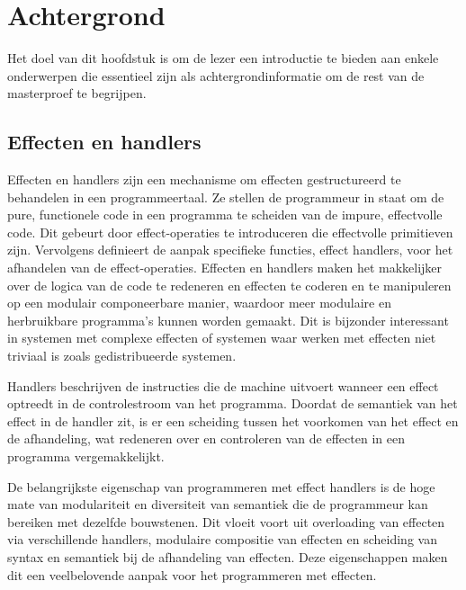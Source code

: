 \newtheorem{theorem}{Theorem}[section]
\newtheorem{lemma}[theorem]{Lemma}


\chapter{Achtergrond}
\label{hoofdstuk:achtergrond}
Het doel van dit hoofdstuk is om de lezer een introductie te bieden aan enkele onderwerpen die essentieel zijn als achtergrondinformatie om de rest van de masterproef te begrijpen.

\section{Effecten en handlers} \label{sec:achtergrondAlgEff}
Effecten en handlers \cite{Bauer2015} zijn een mechanisme om effecten gestructureerd te behandelen in een programmeertaal. Ze stellen de programmeur in staat om de pure, functionele code in een programma te scheiden van de impure, effectvolle code. Dit gebeurt door effect-operaties te introduceren die effectvolle primitieven zijn. Vervolgens definieert de aanpak specifieke functies, effect handlers, voor het afhandelen van de effect-operaties. Effecten en handlers maken het makkelijker over de logica van de code te redeneren en effecten te coderen en te manipuleren op een modulair componeerbare manier, waardoor meer modulaire en herbruikbare programma's kunnen worden gemaakt. Dit is bijzonder interessant in systemen met complexe effecten of systemen waar werken met effecten niet triviaal is zoals gedistribueerde systemen. \newline

Handlers beschrijven de instructies die de machine uitvoert wanneer een effect optreedt in de controlestroom van het programma. Doordat de semantiek van het effect in de handler zit, is er een scheiding tussen het voorkomen van het effect en de afhandeling, wat redeneren over en controleren van de effecten in een programma vergemakkelijkt. \newline

De belangrijkste eigenschap van programmeren met effect handlers is de hoge mate van modulariteit en diversiteit van semantiek die de programmeur kan bereiken met dezelfde bouwstenen. Dit vloeit voort uit overloading van effecten via verschillende handlers, modulaire compositie van effecten en scheiding van syntax en semantiek bij de afhandeling van effecten. Deze eigenschappen maken dit een veelbelovende aanpak voor het programmeren met effecten. 

